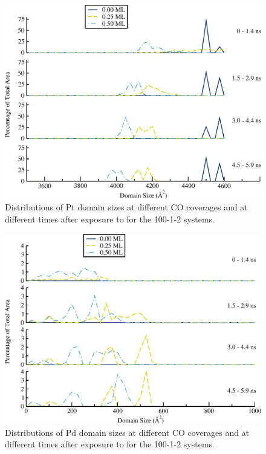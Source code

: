 \begin{figure}
\centering
  \includegraphics[width=\linewidth]{../figures/appD/ds_100_1Pt_2Pd_Pt.pdf}
  \caption{Distributions of Pt domain sizes at different CO coverages and at
different times after exposure to  for the 100-1-2
systems.}
\label{fig:ds100Pt}
\end{figure}


\begin{figure}
\centering
  \includegraphics[width=\linewidth]{../figures/appD/ds_100_1Pt_2Pd_Pd.pdf}
  \caption{Distributions of Pd domain sizes at different CO coverages and at
different times after exposure to  for the 100-1-2
systems.}
\label{fig:ds100Pd}
\end{figure}

